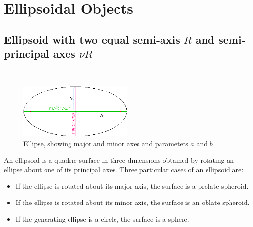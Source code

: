 \clearpage
\section{Ellipsoidal Objects}
\label{sect:EllipsoidalObjects}

\subsection{Ellipsoid with two equal semi-axis $R$ and semi-principal axes $\nu R$}
\label{sect:Ellipsoid_ii} ~\\


\begin{figure}[htb]
\begin{center}
\includegraphics[width=0.5\textwidth,height=0.245\textwidth]{../images/form_factor/Ellipsoid/Elpsminr.png}
\end{center}
\caption{Ellipse, showing major and minor axes and parameters $a$ and $b$}
\label{minormajoraxes}
\end{figure}

An ellipsoid is a quadric surface in three dimensions obtained by
rotating an ellipse about one of its principal axes. Three
particular cases of an ellipsoid are:
\begin{itemize}
\item If the ellipse is rotated about its major axis, the surface is a prolate spheroid.
\item If the ellipse is rotated about its minor axis, the surface is an oblate spheroid.
\item If the generating ellipse is a circle, the surface is a sphere.
\end{itemize}

